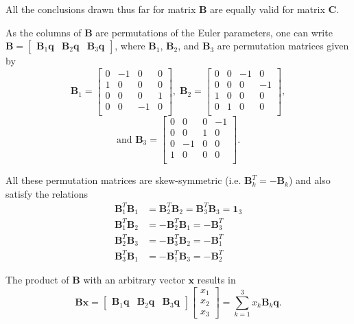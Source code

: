 \documentclass[aip,jcp,reprint,amsmath,amssymb]{revtex4-1}
\newcommand{\mt}[1]{\boldsymbol{\mathbf{#1}}}           %
\newcommand{\vt}[1]{\boldsymbol{\mathbf{#1}}}           %
\newcommand{\tr}[1]{#1^T}                               %
\begin{document}
All the conclusions drawn thus far for matrix $\mt B$ are equally valid for matrix $\mt C$.

As the columns of $\mt B$ are permutations of the Euler parameters, one can write $\mt B = [\begin{array}{ccc}{\mt B}_1{\vt q} & {\mt B}_2{\vt q} & {\mt B}_3{\vt q}\end{array}]$, where $\mt B_1$, $\mt B_2$, and $\mt B_3$ are permutation matrices given by
\[
{\mt B}_1 = \left[ \begin{array}{rrrr}
 0 & -1 &  0 &  0 \\
 1 &  0 &  0 &  0 \\
 0 &  0 &  0 &  1 \\
 0 &  0 & -1 &  0 \\
\end{array} \right], \;
{\mt B}_2 = \left[ \begin{array}{rrrr}
 0 &  0 & -1 &  0 \\
 0 &  0 &  0 & -1 \\
 1 &  0 &  0 &  0 \\
 0 &  1 &  0 &  0 \\
\end{array} \right],
\]\[
\text{and }{\mt B}_3 = \left[ \begin{array}{rrrr}
 0 &  0 &  0 & -1 \\
 0 &  0 &  1 &  0 \\
 0 & -1 &  0 &  0 \\
 1 &  0 &  0 &  0 \\
\end{array} \right].
\]

All these permutation matrices are skew-symmetric (i.e. $\tr{\mt B_k} = -\mt B_k$) and also satisfy the relations\cite{Dichmann1999}
\begin{equation}
\label{eq:BB_products}
\begin{aligned}
\tr{\mt B_1}{\mt B_1} &= \tr{\mt B_2}{\mt B_2} = \tr{\mt B_3}{\mt B_3} = \mt 1_3 \\
\tr{\mt B_1}{\mt B_2} &= -\tr{\mt B_2}{\mt B_1} = -\tr{\mt B_3} \\
\tr{\mt B_2}{\mt B_3} &= -\tr{\mt B_3}{\mt B_2} = -\tr{\mt B_1} \\
\tr{\mt B_3}{\mt B_1} &= -\tr{\mt B_1}{\mt B_3} = -\tr{\mt B_2}
\end{aligned}
\end{equation}

The product of $\mt B$ with an arbitrary vector $\vt x$ results in
\begin{equation}
\label{eq:product_B_vector}
\mt B \vt x = \left[ \begin{array}{ccc} \mt B_1 \vt q & \mt B_2 \vt q & \mt B_3 \vt q \end{array}\right] \left[ \begin{array}{c} x_1 \\ x_2 \\ x_3 \end{array} \right] = \sum_{k=1}^3 x_k {\mt B}_k \vt q.
\end{equation}
\end{document}
